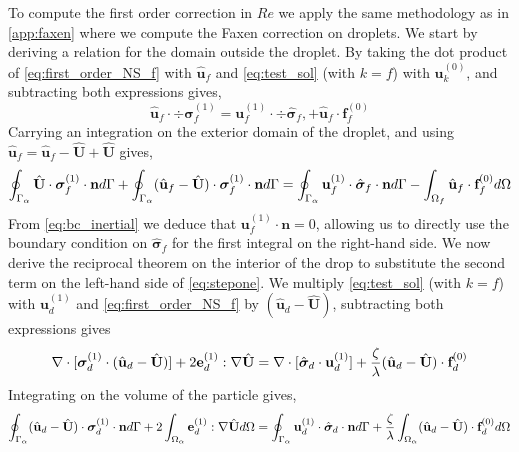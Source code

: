 To compute the first order correction in $Re$ we apply the same methodology as in \ref{app:faxen} where we compute the Faxen correction on droplets.%
We start by deriving a relation for the domain outside the droplet.
By taking the dot product of \ref{eq:first_order_NS_f} with $\hat{\textbf{u}}_f$ and \ref{eq:test_sol} (with $k = f$) with $\textbf{u}_k^{(0)}$, and subtracting both expressions gives, 
\begin{equation*}
    \hat{\textbf{u}}_f\cdot \div\bm\sigma_f^{(1)}
    =
    \textbf{u}_f^{(1)} \cdot \div \hat{\bm\sigma}_f, 
    + \hat{\textbf{u}}_f\cdot  \textbf{f}^{(0)}_f
\end{equation*}
Carrying an integration on the exterior domain of the droplet, and using $\hat{\textbf{u}}_f =\hat{\textbf{u}}_f  - \hat{\textbf{U}} + \hat{\textbf{U}}$ gives, 
\begin{equation}
    \intS{\hat{\textbf{U}}\cdot  \bm\sigma_f^{(1)} \cdot \textbf{n}}
    + \intS{(\hat{\textbf{u}}_f - \hat{\textbf{U}})\cdot  \bm\sigma_f^{(1)} \cdot \textbf{n}}
    = 
    \intS{\textbf{u}_f^{(1)}\cdot  \hat{\bm\sigma}_f \cdot \textbf{n}}
    - \intOf{\hat{\textbf{u}}_f\cdot  \textbf{f}^{(0)}_f}
    \label{eq:stepone}
\end{equation}
From \ref{eq:bc_inertial} we deduce that $\textbf{u}_f^{(1)} \cdot \textbf{n} = 0$, allowing us to directly use the boundary condition on $\hat{\bm\sigma}_f$ for the first integral on the right-hand side. 
We now derive the reciprocal theorem on the interior of the drop to substitute the second term on the left-hand side of \ref{eq:stepone}. 
We multiply \ref{eq:test_sol} (with $k = f$) with $\textbf{u}_d^{(1)}$ and \ref{eq:first_order_NS_f} by $(\hat{\textbf{u}}_d - \hat{\textbf{U}})$, subtracting both expressions gives
\begin{equation*}
     \mathbf{\nabla}\cdot [\bm\sigma_d^{(1)} \cdot (\hat{\textbf{u}}_d - \hat{\textbf{U}})]
     +2 \textbf{e}_d^{(1)} : \mathbf{\nabla} \hat{\textbf{U}}
     =
     \mathbf{\nabla}\cdot [\hat{\bm\sigma}_d \cdot \textbf{u}_d^{(1)}]
     + \frac{\zeta}{\lambda}(\hat{\textbf{u}}_d - \hat{\textbf{U}}) \cdot \textbf{f}_d^{(0)}
\end{equation*}
Integrating on the volume of the particle gives, 
\begin{equation}
    \intS{ (\hat{\textbf{u}}_d - \hat{\textbf{U}})\cdot \bm\sigma_d^{(1)} \cdot \textbf{n}}
    + 2 \intO{ \textbf{e}_d^{(1)} : \grad \hat{\textbf{U}} }
    =
    \intS{\textbf{u}_d^{(1)}\cdot\hat{\bm\sigma}_d \cdot \textbf{n}} 
    + \frac{\zeta}{\lambda} \intO{(\hat{\textbf{u}}_d - \hat{\textbf{U}}) \cdot \textbf{f}_d^{(0)}}
    \label{eq:reci_interior}
\end{equation}
